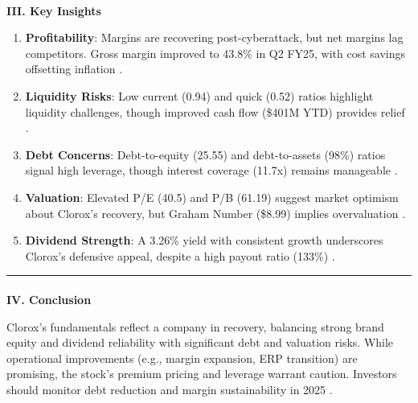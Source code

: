 \documentclass[
  letterpaper,
  DIV=11,
  numbers=noendperiod]{scrartcl}
\makeatletter
\let\oldparagraph\paragraph
\renewcommand{\paragraph}{
    \@ifstar
      \xxxParagraphStar
      \xxxParagraphNoStar
  }
\newcommand{\xxxParagraphStar}[1]{\oldparagraph*{#1}\mbox{}}
\newcommand{\xxxParagraphNoStar}[1]{\oldparagraph{#1}\mbox{}}
\providecommand{\tightlist}{%
  \setlength{\itemsep}{0pt}\setlength{\parskip}{0pt}}\usepackage{longtable,booktabs,array}
\makeatother
\begin{document}
\paragraph{\texorpdfstring{\textbf{III. Key
Insights}}{III. Key Insights}}\label{iii.-key-insights}

\begin{enumerate}
\def\labelenumi{\arabic{enumi}.}
\tightlist
\item
  \textbf{Profitability}: Margins are recovering post-cyberattack, but
  net margins lag competitors. Gross margin improved to 43.8\% in Q2
  FY25, with cost savings offsetting inflation .\\
\item
  \textbf{Liquidity Risks}: Low current (0.94) and quick (0.52) ratios
  highlight liquidity challenges, though improved cash flow (\$401M YTD)
  provides relief .\\
\item
  \textbf{Debt Concerns}: Debt-to-equity (25.55) and debt-to-assets
  (98\%) ratios signal high leverage, though interest coverage (11.7x)
  remains manageable .\\
\item
  \textbf{Valuation}: Elevated P/E (40.5) and P/B (61.19) suggest market
  optimism about Clorox's recovery, but Graham Number (\$8.99) implies
  overvaluation .\\
\item
  \textbf{Dividend Strength}: A 3.26\% yield with consistent growth
  underscores Clorox's defensive appeal, despite a high payout ratio
  (133\%) .
\end{enumerate}

\begin{center}\rule{0.5\linewidth}{0.5pt}\end{center}

\paragraph{\texorpdfstring{\textbf{IV.
Conclusion}}{IV. Conclusion}}\label{iv.-conclusion}

Clorox's fundamentals reflect a company in recovery, balancing strong
brand equity and dividend reliability with significant debt and
valuation risks. While operational improvements (e.g., margin expansion,
ERP transition) are promising, the stock's premium pricing and leverage
warrant caution. Investors should monitor debt reduction and margin
sustainability in 2025 .
\end{document}
